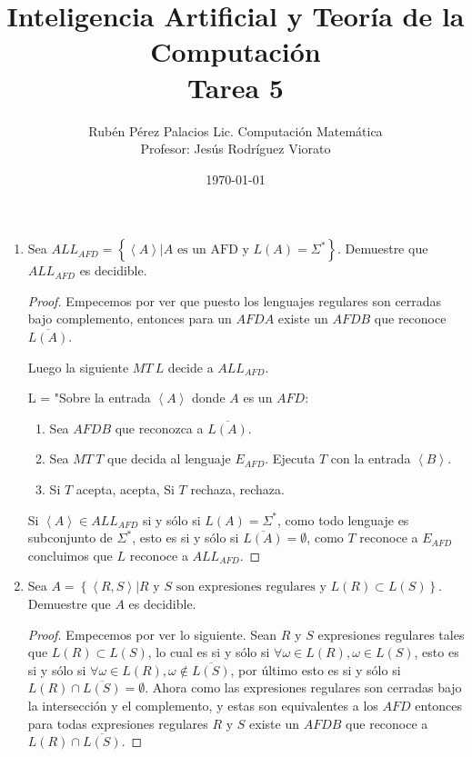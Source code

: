 \documentclass[letterpaper]{article}
\title{Inteligencia Artificial y Teoría de la Computación \\ Tarea 5}
\author{Rubén Pérez Palacios Lic. Computación Matemática\\Profesor: Jesús Rodríguez Viorato}
\date{\today}
\theoremstyle{definition}
\theoremstyle{lemathm}
\theoremstyle{lemathm}
\theoremstyle{lemathm}
\theoremstyle{lemademthm}
\newcommand{\txty}{\text{ y }}
\newcommand{\pars}[1]{\left( #1 \right) }
\newcommand{\inprod}[1]{\left\langle #1 \right\rangle }
\newcommand{\set}[1]{\left \{ #1 \right\} }
\newcommand{\1}{\mathbbm{1}}
\begin{document}
	\maketitle

	\begin{enumerate}
			\item Sea $ALL_{AFD} = \set{\inprod{A} | A \text{ es un AFD y } L\pars{A} = \Sigma^*}$. Demuestre que $ALL_{AFD}$ es decidible.
			\begin{proof}
				Empecemos por ver que puesto los lenguajes regulares son cerradas bajo complemento, entonces para un $AFD A$ existe un $AFD B$ que reconoce $\overline{L\pars{A}}$.

				Luego la siguiente $MT \ L$ decide a $ALL_{AFD}$.

				L = "Sobre la entrada $\inprod{A}$ donde $A$ es un $AFD$:
				\begin{enumerate}
					\item Sea $AFD B$ que reconozca a $\overline{L\pars{A}}$.
					\item Sea $MT \ T$ que decida al lenguaje $E_{AFD}$. Ejecuta $T$ con la entrada $\inprod{B}$.
					\item Si $T$ acepta, acepta, Si $T$ rechaza, rechaza.
				\end{enumerate}

				Si $\inprod{A} \in ALL_{AFD}$ si y sólo si $L\pars{A} = \Sigma^*$, como todo lenguaje es subconjunto de $\Sigma^*$, esto es si y sólo si $\overline{L\pars{A}} = \emptyset$, como $T$ reconoce a $E_{AFD}$ concluimos que $L$ reconoce a $ALL_{AFD}$.
			\end{proof}

			\item Sea $A = \set{\inprod{R,S} | R \txty S \text{ son expresiones regulares y }L\pars{R}\subset L\pars{S}}$. Demuestre que $A$ es decidible.
			\begin{proof}
				Empecemos por ver lo siguiente. Sean $R$ y $S$ expresiones regulares tales que $L\pars{R}\subset L\pars{S}$, lo cual es si y sólo si $\forall \omega\in L\pars{R}, \omega \in L\pars{S}$, esto es si y sólo si $\forall \omega\in L\pars{R}, \omega \not\in \overline{L\pars{S}}$, por último esto es si y sólo si $L\pars{R}\cap \overline{L\pars{S}} = \emptyset$. Ahora como las expresiones regulares son cerradas bajo la intersección y el complemento, y estas son equivalentes a los $AFD$ entonces para todas expresiones regulares $R$ y $S$ existe un $AFD B$ que reconoce a $L\pars{R}\cap \overline{L\pars{S}}$.


\end{proof}
\end{enumerate}
\end{document}
